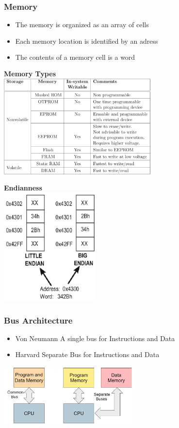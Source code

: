 \subsubsection{Memory}
		\begin{itemize}
			\item The memory is organized as an array of cells
			\item Each memory location is identified by an adress
			\item The contents of a memory cell is a word
		\end{itemize}
	\begin{multicols}{2}
	\textbf{Memory Types}\\
	\includegraphics[width=8cm]{images/memorytypes.png}
	
	\textbf{Endianness}\\
	\includegraphics[width=5cm]{images/be_le.png}
	\end{multicols}
\subsubsection{Bus Architecture}
\begin{minipage}{9cm}
	\begin{itemize}
		\item Von Neumann
		\subitem A single bus for Instructions and Data
		\item Harvard
		\subitem Separate Bus for Instructions and Data
	\end{itemize}
\end{minipage}
\begin{minipage}{7cm}
	\includegraphics[width=7cm]{images/bus.png}
\end{minipage}

